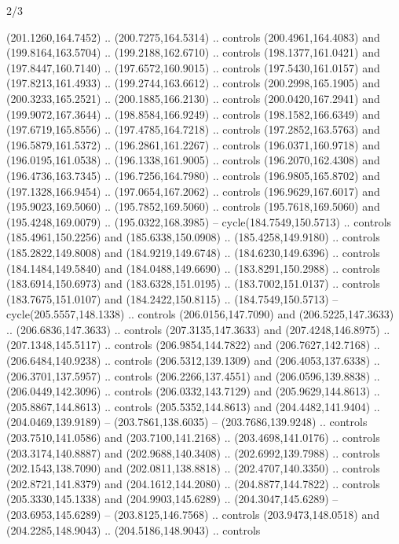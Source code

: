 \begin{flagdescription}{2/3}
\begin{scope}[xshift=0.5\flaglength,yshift=0.5\flagwidth,scale=\flagwidth/180]
\begin{scope}[y=0.8pt, x=0.8pt, yscale=-1,shift={(-168.75,-108.75)}]
  (201.1260,164.7452) .. (200.7275,164.5314) .. controls (200.4961,164.4083) and
  (199.8164,163.5704) .. (199.2188,162.6710) .. controls (198.1377,161.0421) and
  (197.8447,160.7140) .. (197.6572,160.9015) .. controls (197.5430,161.0157) and
  (197.8213,161.4933) .. (199.2744,163.6612) .. controls (200.2998,165.1905) and
  (200.3233,165.2521) .. (200.1885,166.2130) .. controls (200.0420,167.2941) and
  (199.9072,167.3644) .. (198.8584,166.9249) .. controls (198.1582,166.6349) and
  (197.6719,165.8556) .. (197.4785,164.7218) .. controls (197.2852,163.5763) and
  (196.5879,161.5372) .. (196.2861,161.2267) .. controls (196.0371,160.9718) and
  (196.0195,161.0538) .. (196.1338,161.9005) .. controls (196.2070,162.4308) and
  (196.4736,163.7345) .. (196.7256,164.7980) .. controls (196.9805,165.8702) and
  (197.1328,166.9454) .. (197.0654,167.2062) .. controls (196.9629,167.6017) and
  (195.9023,169.5060) .. (195.7852,169.5060) .. controls (195.7618,169.5060) and
  (195.4248,169.0079) .. (195.0322,168.3985) -- cycle(184.7549,150.5713) ..
  controls (185.4961,150.2256) and (185.6338,150.0908) .. (185.4258,149.9180) ..
  controls (185.2822,149.8008) and (184.9219,149.6748) .. (184.6230,149.6396) ..
  controls (184.1484,149.5840) and (184.0488,149.6690) .. (183.8291,150.2988) ..
  controls (183.6914,150.6973) and (183.6328,151.0195) .. (183.7002,151.0137) ..
  controls (183.7675,151.0107) and (184.2422,150.8115) .. (184.7549,150.5713) --
  cycle(205.5557,148.1338) .. controls (206.0156,147.7090) and
  (206.5225,147.3633) .. (206.6836,147.3633) .. controls (207.3135,147.3633) and
  (207.4248,146.8975) .. (207.1348,145.5117) .. controls (206.9854,144.7822) and
  (206.7627,142.7168) .. (206.6484,140.9238) .. controls (206.5312,139.1309) and
  (206.4053,137.6338) .. (206.3701,137.5957) .. controls (206.2266,137.4551) and
  (206.0596,139.8838) .. (206.0449,142.3096) .. controls (206.0332,143.7129) and
  (205.9629,144.8613) .. (205.8867,144.8613) .. controls (205.5352,144.8613) and
  (204.4482,141.9404) .. (204.0469,139.9189) -- (203.7861,138.6035) --
  (203.7686,139.9248) .. controls (203.7510,141.0586) and (203.7100,141.2168) ..
  (203.4698,141.0176) .. controls (203.3174,140.8887) and (202.9688,140.3408) ..
  (202.6992,139.7988) .. controls (202.1543,138.7090) and (202.0811,138.8818) ..
  (202.4707,140.3350) .. controls (202.8721,141.8379) and (204.1612,144.2080) ..
  (204.8877,144.7822) .. controls (205.3330,145.1338) and (204.9903,145.6289) ..
  (204.3047,145.6289) -- (203.6953,145.6289) -- (203.8125,146.7568) .. controls
  (203.9473,148.0518) and (204.2285,148.9043) .. (204.5186,148.9043) .. controls

\end{scope}
\end{scope}
\end{flagdescription}
